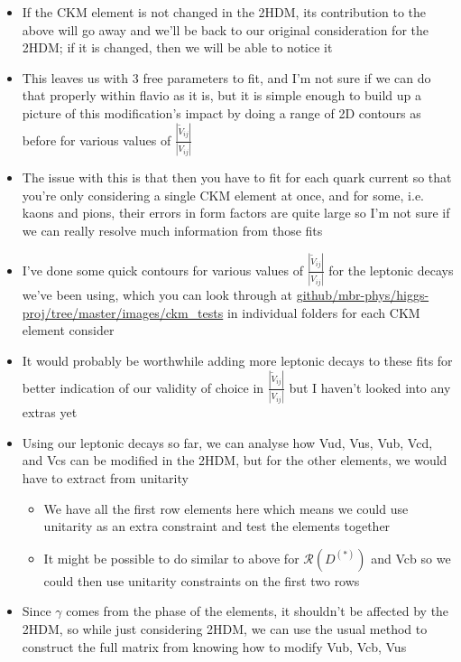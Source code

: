 \documentclass[11pt]{article}
\newcommand{\tVV}{\frac{|\tilde{V}_{ij}|}{|V_{ij}|}}
\begin{document}
\begin{itemize}
    \item If the CKM element is not changed in the 2HDM, its contribution to the above will go away and we'll be back to our original consideration for the 2HDM; if it is changed, then we will be able to notice it
    \item This leaves us with 3 free parameters to fit, and I'm not sure if we can do that properly within flavio as it is, but it is simple enough to build up a picture of this modification's impact by doing a range of 2D contours as before for various values of $\tVV$
    \item The issue with this is that then you have to fit for each quark current so that you're only considering a single CKM element at once, and for some, i.e. kaons and pions, their errors in form factors are quite large so I'm not sure if we can really resolve much information from those fits
    \item I've done some quick contours for various values of $\tVV$ for the leptonic decays we've been using, which you can look through at \href{https://github.com/mbr-phys/higgs-proj/tree/master/images/ckm_tests}{github/mbr-phys/higgs-proj/tree/master/images/ckm\_tests} in individual folders for each CKM element consider
    \item It would probably be worthwhile adding more leptonic decays to these fits for better indication of our validity of choice in $\tVV$ but I haven't looked into any extras yet
    \item Using our leptonic decays so far, we can analyse how Vud, Vus, Vub, Vcd, and Vcs can be modified in the 2HDM, but for the other elements, we would have to extract from unitarity 
        \begin{itemize}
            \item We have all the first row elements here which means we could use unitarity as an extra constraint and test the elements together
            \item It might be possible to do similar to above for $\mathcal{R}(D^{(*)})$ and Vcb so we could then use unitarity constraints on the first two rows
        \end{itemize}
    \item Since $\gamma$ comes from the phase of the elements, it shouldn't be affected by the 2HDM, so while just considering 2HDM, we can use the usual method to construct the full matrix from knowing how to modify Vub, Vcb, Vus
\end{itemize}
\end{document}
